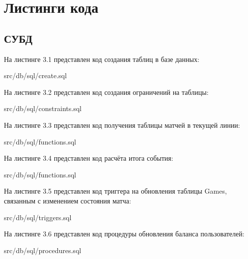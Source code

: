 \section{Листинги кода}

\subsection{СУБД}
На листинге 3.1 представлен код создания таблиц в базе данных:

\FloatBarrier
\begin{lstinputlisting}[language=SQL, caption=Создание таблиц в БД, 
	basicstyle=\footnotesize\ttfamily, frame=single,breaklines=true]{src/db/sql/create.sql}
\end{lstinputlisting}
\FloatBarrier

На листинге 3.2 представлен код создания ограничений на таблицы:
\FloatBarrier
\begin{lstinputlisting}[language=SQL, caption=Создание ограничений на таблицы, 
	basicstyle=\footnotesize\ttfamily, frame=single,breaklines=true]{src/db/sql/constraints.sql}
\end{lstinputlisting}
\FloatBarrier

На листинге 3.3 представлен код получения таблицы матчей в текущей линии:
\FloatBarrier
\begin{lstinputlisting}[language=SQL, caption=Получение таблицы матчей в текущей линии, linerange = {78-101},
	basicstyle=\footnotesize\ttfamily, frame=single, breaklines=true]{src/db/sql/functions.sql}
\end{lstinputlisting}
\FloatBarrier


На листинге 3.4 представлен код расчёта итога события:
\FloatBarrier
\begin{lstinputlisting}[language=SQL, caption=Расчёт итога события, linerange = {127-151},
	basicstyle=\footnotesize\ttfamily, frame=single,breaklines=true]{src/db/sql/functions.sql}
\end{lstinputlisting}
\FloatBarrier

На листинге 3.5 представлен код триггера на обновления таблицы Games, связанным с изменением состояния матча:
\FloatBarrier
\begin{lstinputlisting}[language=SQL, caption=Триггер на обновление таблицы Games, linerange = {23-50},
	basicstyle=\footnotesize\ttfamily, frame=single,breaklines=true]{src/db/sql/triggers.sql}
\end{lstinputlisting}
\FloatBarrier

На листинге 3.6 представлен код процедуры обновления баланса пользователей:
\FloatBarrier
\begin{lstinputlisting}[language=SQL, caption=Обновление балансов пользователй, linerange = {112-134},
	basicstyle=\footnotesize\ttfamily, frame=single,breaklines=true]{src/db/sql/procedures.sql}
\end{lstinputlisting}
\FloatBarrier

